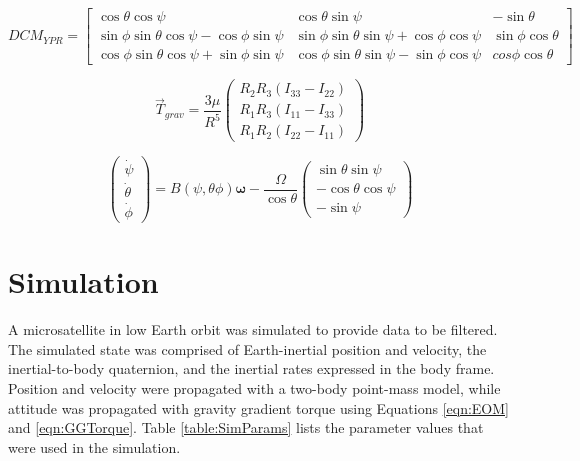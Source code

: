 \documentclass[]{aiaa-tc}%
\begin{document}
	\begin{equation}
		DCM_{YPR} = \begin{bmatrix}
		\cos\theta\cos\psi & \cos\theta\sin\psi & -\sin\theta\\ 
		\sin\phi\sin\theta\cos\psi -\cos\phi\sin\psi& \sin\phi\sin\theta\sin\psi+\cos\phi\cos\psi & \sin\phi\cos\theta\\ 
		\cos\phi\sin\theta\cos\psi+\sin\phi\sin\psi & \cos\phi\sin\theta\sin\psi-\sin\phi\cos\psi & cos\phi\cos\theta
		\end{bmatrix}
		\label{eqn:DCM_Euler}
	\end{equation}

	\begin{equation}
		\vec{T}_{grav} = \frac{3\mu}{R^5}\begin{pmatrix}
		R_2R_3(I_{33}-I_{22})\\ 
		R_1R_3(I_{11}-I_{33})\\ 
		R_1R_2(I_{22}-I_{11})
		\end{pmatrix}
		\label{eqn:GGTorque}
	\end{equation}

	\begin{equation}
		\begin{pmatrix}
		\dot{\psi}\\ 
		\dot{\theta}\\ 
		\dot{\phi}
		\end{pmatrix} = 
		B(\psi,\theta\phi)\boldsymbol{\omega}-\frac{\Omega}{\cos\theta}\begin{pmatrix}
		\sin\theta\sin\psi\\ 
		-\cos\theta\cos\psi\\ 
		-\sin\psi
		\end{pmatrix}
		\label{eqn:EulerGGDiffEq}
	\end{equation}
	\section{Simulation}

A microsatellite in low Earth orbit was simulated to provide data to be filtered. The simulated state was comprised of Earth-inertial position and velocity, the inertial-to-body quaternion, and the inertial rates expressed in the body frame. Position and velocity were propagated with a two-body point-mass model, while attitude was propagated with gravity gradient torque using Equations \ref{eqn:EOM} and \ref{eqn:GGTorque}. Table \ref{table:SimParams} lists the parameter values that were used in the simulation.
\end{document}
